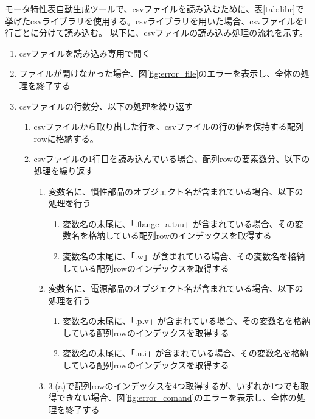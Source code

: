 モータ特性表自動生成ツールで、csvファイルを読み込むために、表\ref{tab:libr}で挙げたcsvライブラリを使用する。csvライブラリを用いた場合、csvファイルを1行ごとに分けて読み込む。
以下に、csvファイルの読み込み処理の流れを示す。
\begin{enumerate}
    \item csvファイルを読み込み専用で開く
    \item ファイルが開けなかった場合、図\ref{fig:error_file}のエラーを表示し、全体の処理を終了する
    \item csvファイルの行数分、以下の処理を繰り返す
    \begin{enumerate}
        \item csvファイルから取り出した行を、csvファイルの行の値を保持する配列rowに格納する。
        \item csvファイルの1行目を読み込んでいる場合、配列rowの要素数分、以下の処理を繰り返す
            \begin{enumerate}
                \item 変数名に、慣性部品のオブジェクト名が含まれている場合、以下の処理を行う
                \begin{enumerate}
                    \item 変数名の末尾に、「.flange\_a.tau」が含まれている場合、その変数名を格納している配列rowのインデックスを取得する
                    \item 変数名の末尾に、「.w」が含まれている場合、その変数名を格納している配列rowのインデックスを取得する
                \end{enumerate}
                \item 変数名に、電源部品のオブジェクト名が含まれている場合、以下の処理を行う
                \begin{enumerate}
                    \item 変数名の末尾に、「.p.v」が含まれている場合、その変数名を格納している配列rowのインデックスを取得する
                    \item 変数名の末尾に、「.n.i」が含まれている場合、その変数名を格納している配列rowのインデックスを取得する
                \end{enumerate}
                \item 3.(a)で配列rowのインデックスを4つ取得するが、いずれか1つでも取得できない場合、図\ref{fig:error_comand}のエラーを表示し、全体の処理を終了する
            \end{enumerate}
  

\end{enumerate}
\end{enumerate}
